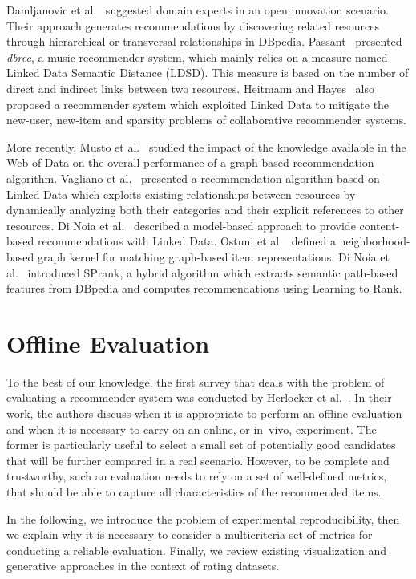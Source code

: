 Damljanovic et al.~\cite{Damljanovic2012} suggested domain experts in an open innovation scenario. Their approach generates recommendations by discovering related resources through hierarchical or transversal relationships in DBpedia. Passant~\cite{Passant2010} presented \emph{dbrec}, a music recommender system, which mainly relies on a measure named Linked Data Semantic Distance (LDSD). This measure is based on the number of direct and indirect links between two resources. Heitmann and Hayes~\cite{Heitmann2010} also proposed a recommender system which exploited Linked Data to mitigate the new-user, new-item and sparsity problems of collaborative recommender systems.

More recently, Musto et al.~\cite{Musto2016} studied the impact of the knowledge available in the Web of Data on the overall performance of a graph-based recommendation algorithm. Vagliano et al.~\cite{Vagliano2016} presented a recommendation algorithm based on Linked Data which exploits existing relationships between resources by dynamically analyzing both their categories and their explicit references to other resources. Di Noia et al.~\cite{DiNoia2012} described a model-based approach to provide content-based recommendations with Linked Data. Ostuni et al.~\cite{Ostuni2014} defined a neighborhood-based graph kernel for matching graph-based item representations. Di Noia et al.~\cite{DiNoia2016} introduced SPrank, a hybrid algorithm which extracts semantic path-based features from DBpedia and computes recommendations using Learning to Rank.

\section{Offline Evaluation}
\label{soa:sec:evaluation}

To the best of our knowledge, the first survey that deals with the problem of evaluating a recommender system was conducted by Herlocker et al.~\cite{Herlocker2004}. In their work, the authors discuss when it is appropriate to perform an offline evaluation and when it is necessary to carry on an online, or in~vivo, experiment. The former is particularly useful to select a small set of potentially good candidates that will be further compared in a real scenario. However, to be complete and trustworthy, such an evaluation needs to rely on a set of well-defined metrics, that should be able to capture all characteristics of the recommended items.

In the following, we introduce the problem of experimental reproducibility, then we explain why it is necessary to consider a multicriteria set of metrics for conducting a reliable evaluation. Finally, we review existing visualization and generative approaches in the context of rating datasets.

